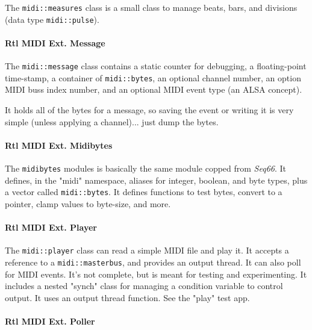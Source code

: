    The \texttt{midi::measures} class is a small class to manage
   beats, bars, and divisions (data type \texttt{midi::pulse}).

\paragraph{Rtl MIDI Ext. Message}
\label{paragraph:rtl_midi_extensions_message}

   The \texttt{midi::message} class contains a static counter for debugging,
   a floating-point time-stamp, a container of \texttt{midi::bytes},
   an optional channel number, an option MIDI buss index number, and
   an optional MIDI event type (an ALSA concept).

   It holds all of the bytes for a message, so saving the event or writing it
   is very simple (unless applying a channel)... just dump the bytes.

\paragraph{Rtl MIDI Ext. Midibytes}
\label{paragraph:rtl_midi_extensions_bytes}

   The \texttt{midibytes} modules is basically the same module
   copped from \textsl{Seq66}. It defines, in the "midi" namespace,
   aliases for integer, boolean, and byte types, plus a vector called
   \texttt{midi::bytes}. It defines functions to test bytes, convert to
   a pointer, clamp values to byte-size, and more.

\paragraph{Rtl MIDI Ext. Player}
\label{paragraph:rtl_midi_extensions_player}

   The \texttt{midi::player} class can read a simple MIDI file and play it.
   It accepts a reference to a \texttt{midi::masterbus}, and provides 
   an output thread. It can also poll for MIDI events.
   It's not complete, but is meant for testing and experimenting.
   It includes a nested "synch" class for managing a condition variable 
   to control output.
   It uses an output thread function.
   See the "play" test app.

\paragraph{Rtl MIDI Ext. Poller}
\label{paragraph:rtl_midi_extensions_poller}

